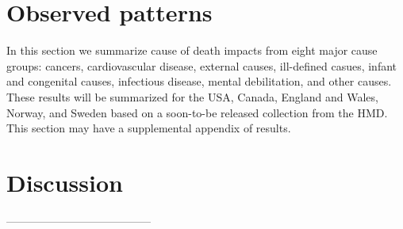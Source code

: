 \documentclass{article}
\begin{document}
\FloatBarrier

\section*{Observed patterns}
In this section we summarize cause of death impacts from eight
major cause groups: cancers, cardiovascular disease, external causes, ill-defined casues, infant and congenital causes, infectious disease, mental
debilitation, and other causes. These results will be summarized for the USA,
Canada, England and Wales, Norway, and Sweden based on a soon-to-be
released collection from the HMD. This section may have a supplemental appendix
of results.

\section*{Discussion}



% 
---------------------------------------

    
\end{document}
